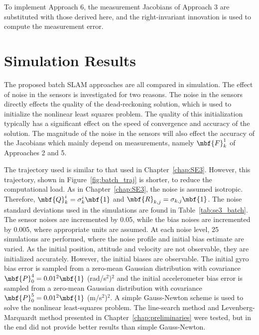 To implement Approach 6, the measurement Jacobians of Approach 3 are substituted with those derived here, and the right-invariant innovation is used to compute the measurement error. 

\section{Simulation Results}

The proposed batch SLAM approaches are all compared in simulation. The effect of noise in the sensors is investigated for two reasons. The noise in the sensors directly effects the quality of the dead-reckoning solution, which is used to initialize the nonlinear least squares problem. The quality of this initialization typically has a significant effect on the speed of convergence and accuracy of the solution. The magnitude of the noise in the sensors will also effect the accuracy of the Jacobians which mainly depend on measurements, namely $\mbf{F}_k^1$ of Approaches 2 and 5. 

The trajectory used is similar to that used in Chapter~\ref{chap:SE3}. However, this trajectory, shown in Figure~\ref{fig:batch_traj} is shorter, to reduce the computational load. As in Chapter~\ref{chap:SE3}, the noise is assumed isotropic. Therefore, $\mbf{Q}_k^i = \sigma_k^i\mbf{1}$ and $\mbf{R}_{k,j} = \sigma_{k,j}\mbf{1}$. The noise standard deviations used in the simulations are found in Table~\ref{tab:se3_batch}. The sensor noises are incremented by 0.05, while the bias noises are incremented by 0.005, where appropriate units are assumed. At each noise level, 25 simulations are performed, where the noise profile and initial bias estimate are varied. As the initial position, attitude and velocity are not observable, they are initialized accurately. However, the initial biases are observable. The initial gyro bias error is sampled from a zero-mean Gaussian distribution with covariance $\mbf{P}_0^4 = 0.01^2\mbf{1}$ (rad/s$^2$)$^2$ and the initial accelerometer bias error is sampled from a zero-mean Gaussian distribution with covariance $\mbf{P}_0^5 = 0.01^2\mbf{1}$ (m/s$^2$)$^2$. A simple Gauss-Newton scheme is used to solve the nonlinear least-squares problem. The line-search method and Levenberg-Marquardt method presented in Chapter~\ref{chap:preliminaries} were tested, but in the end did not provide better results than simple Gauss-Newton.

